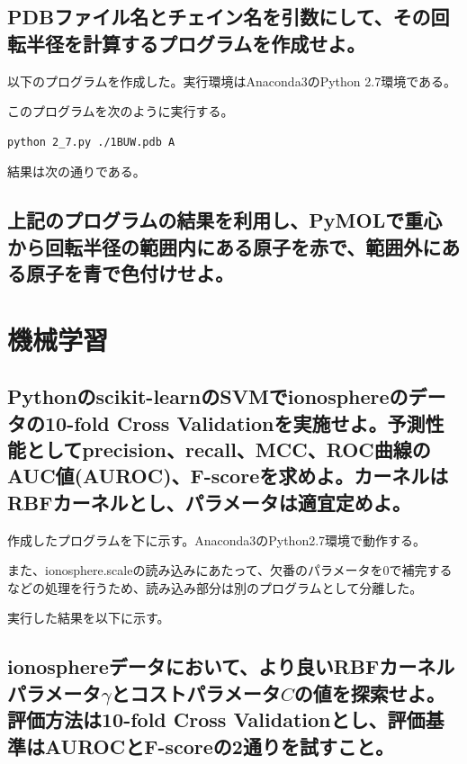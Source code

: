 \documentclass[uplatex,a4j]{jsarticle}
\begin{document}
  \subsection{PDBファイル名とチェイン名を引数にして、その回転半径を計算するプログラムを作成せよ。}
  以下のプログラムを作成した。実行環境はAnaconda3のPython 2.7環境である。
  
  このプログラムを次のように実行する。
  \begin{lstlisting}[caption=実行方法, label=run6]
    python 2_7.py ./1BUW.pdb A
  \end{lstlisting}
  結果は次の通りである。
  
  
  \subsection{上記のプログラムの結果を利用し、PyMOLで重心から回転半径の範囲内にある原子を赤で、範囲外にある原子を青で色付けせよ。}
  
  \section{機械学習}
  \subsection{Pythonのscikit-learnのSVMでionosphereのデータの10-fold Cross Validationを実施せよ。予測性能としてprecision、recall、MCC、ROC曲線のAUC値(AUROC)、F-scoreを求めよ。カーネルはRBFカーネルとし、パラメータは適宜定めよ。}
  作成したプログラムを下に示す。Anaconda3のPython2.7環境で動作する。
  
  また、ionosphere.scaleの読み込みにあたって、欠番のパラメータを0で補完するなどの処理を行うため、読み込み部分は別のプログラムとして分離した。
  
  実行した結果を以下に示す。
  
  
  \subsection{ionosphereデータにおいて、より良いRBFカーネルパラメータ$\gamma$とコストパラメータ$C$の値を探索せよ。評価方法は10-fold Cross Validationとし、評価基準はAUROCとF-scoreの2通りを試すこと。}
  
\end{document}
